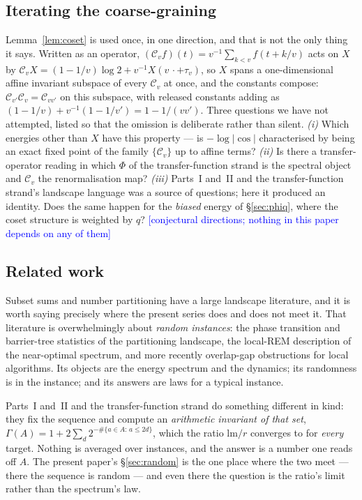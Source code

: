 \documentclass[11pt,a4paper]{article}
\theoremstyle{plain}
\theoremstyle{definition}
\theoremstyle{remark}
\newcommand{\lm}{\mathrm{lm}}
\newcommand{\STATUS}[1]{\textcolor{blue}{\textsf{[#1]}}}
\begin{document}
\subsection{Iterating the coarse-graining}

Lemma~\ref{lem:coset} is used once, in one direction, and that is not the only thing it says.
Written as an operator, $(\mathcal{C}_vf)(t)=v^{-1}\sum_{k<v}f(t+k/v)$ acts on $X$ by
$\mathcal{C}_vX=(1-1/v)\log2+v^{-1}X(v\,\cdot+\tau_v)$, so $X$ spans a one-dimensional affine
invariant subspace of every $\mathcal{C}_v$ at once, and the constants compose:
$\mathcal{C}_{v'}\mathcal{C}_v=\mathcal{C}_{vv'}$ on this subspace, with released constants
adding as $(1-1/v)+v^{-1}(1-1/v')=1-1/(vv')$. Three questions we have not attempted, listed so
that the omission is deliberate rather than silent. \emph{(i)} Which energies other than $X$ have
this property --- is $-\log|\cos|$ characterised by being an exact fixed point of the family
$\{\mathcal{C}_v\}$ up to affine terms? \emph{(ii)} Is there a transfer-operator reading in which
$\Phi$ of the transfer-function strand is the spectral object and $\mathcal{C}_v$ the renormalisation map? \emph{(iii)}
Parts~I and~II and the transfer-function strand's landscape language was a source of questions; here it produced an identity. Does the
same happen for the \emph{biased} energy of \S\ref{sec:phiq}, where the coset structure is
weighted by $q$?
\STATUS{conjectural directions; nothing in this paper depends on any of them}

\subsection{Related work}

Subset sums and number partitioning have a large landscape literature, and it is worth saying
precisely where the present series does and does not meet it. That literature is
overwhelmingly about \emph{random instances}: the phase transition and barrier-tree statistics
of the partitioning landscape, the local-REM description of the near-optimal spectrum, and
more recently overlap-gap obstructions for local algorithms. Its objects are the energy
spectrum and the dynamics; its randomness is in the instance; and its answers are laws for a
typical instance.

Parts~I and~II and the transfer-function strand do something different in kind: they fix the sequence and compute an
\emph{arithmetic invariant of that set}, $\Gamma(A)=1+2\sum_d2^{-\#\{a\in A:\,a\le2d\}}$,
which the ratio
$\lm/r$ converges to for \emph{every} target. Nothing is averaged over instances, and the
answer is a number one reads off $A$. The present paper's \S\ref{sec:random} is the one place
where the two meet --- there the sequence is random --- and even there the question is the
ratio's limit rather than the spectrum's law.
\end{document}
